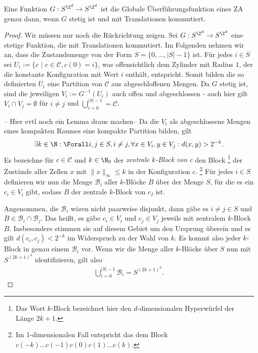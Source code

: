 \begin{theorem}\label{hedlund}
  Eine Funktion $G: S^{\Z^d} \to S^{\Z^d}$ ist die Globale Überführungsfunktion eines ZA genau dann, wenn $G$ stetig ist und mit Translationen kommutiert.
\end{theorem}

\begin{proof}
  Wir müssen nur noch die Rückrichtung zeigen. Sei $G: S^{\Z^d} \to S^{\Z^d}$ eine stetige Funktion, die mit Translationen kommutiert. Im Folgenden nehmen wir an, dass die Zustandsmenge von der Form $S = \{0, \dots, |S|-1\}$ ist. Für jedes $i \in S$ sei $U_i := \{c \text{~}|\text{~} c \in \mathcal{C}, c(0) = i\}$, was offensichtlich dem Zylinder mit Radius $1$, der die konstante Konfiguration mit Wert $i$ enthält, entspricht. Somit bilden die so definierten $U_i$ eine Partition von $\mathcal{C}$ aus abgeschloffenen Mengen. Da $G$ stetig ist, sind die jeweiligen $V_i := G^{-1}(U_i)$ auch offen und abgeschlossen - auch hier gilt $V_i \cap V_j = \emptyset$ für $i \neq j$ und $\bigcup_{i = 0}^{|S|-1} = \mathcal{C}$.


  -- Hier evtl noch ein Lemma draus machen--
  Da die $V_i$ als abgeschlossene Mengen eines kompakten Raumes eine kompakte Partition bilden, gilt
  \begin{align*}
    \exists k \in \N: \Forall i,j \in S, i \neq j, \forall x \in V_i, y\in V_j: d(x,y) > 2^{-k}.
  \end{align*}
  Es bezeichne für $c \in \mathcal{C}$ und $k \in \N_{0}$ der \textit{zentrale $k$-Block von $c$} den Block \footnote{Das Wort $k$-Block bezeichnet hier den $d$-dimensionalen Hyperwürfel der Länge $2k+1$.} der Zustände aller Zellen $x$ mit $\|x\|_\infty \leq k$ in der Konfiguration $c$. \footnote{Im 1-dimensionalen Fall entspricht das dem Block $c(-k) \dots c(-1)c(0)c(1) \dots c(k)$.} Für jedes $i \in S$ definieren wir nun die Menge $\mathcal{B}_i$ aller $k$-Blöcke $B$ über der Menge $S$, für die es ein $c_i \in V_i$ gibt, sodass $B$ der zentrale $k$-Block von $c_I$ ist.

  Angenommen, die $\mathcal{B}_i$ wären nicht paarweise disjunkt, dann gäbe es $i \neq j \in S$ und $B \in \mathcal{B}_i \cap \mathcal{B}_j$. Das heißt, es gäbe $c_i \in V_i$ und $c_j \in V_j$ jeweils mit zentralem $k$-Block $B$. Insbesondere stimmen sie auf diesem Gebiet um den Ursprung überein und es gilt $d(c_i, c_j) < 2^{-k}$ im Widerspruch zu der Wahl von $k$. Es kommt also jeder $k$-Block in genau einem $\mathcal{B}_i$ vor. Wenn wir die Menge aller $k$-Blöcke über $S$ nun mit $S^{(2k+1)^d}$ identifizieren, gilt also
  \begin{align*}
    \bigcup_{i = 0}^{|S|-1} \mathcal{B}_i = S^{(2k+1)^d}.
  \end{align*}


\end{proof}
